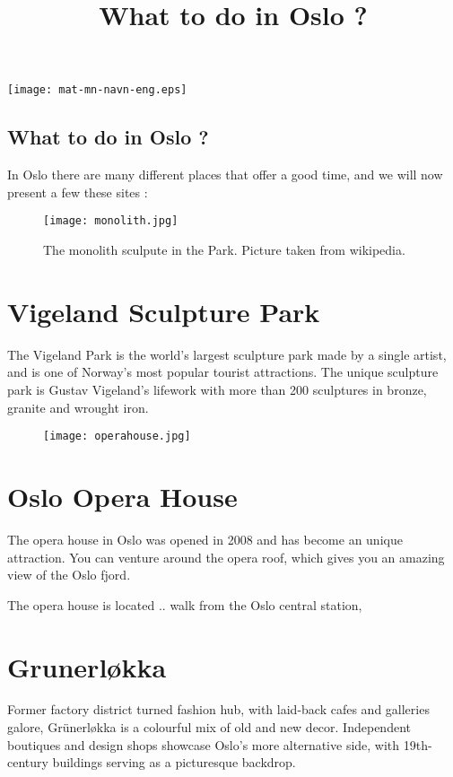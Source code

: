 \documentclass{article}
\title{What to do in Oslo ? }
\begin{document}
\texttt{[image: mat-mn-navn-eng.eps]} 


\begin{center}
\section*{What to do in Oslo ?}
In Oslo there are many different places that offer a good time, and we will now present a few these sites : 


\end{center}
\begin{wrapfigure}[20]{r}{0.5\textwidth}
    \centering
    \captionsetup{width=0.4\textwidth}
    \texttt{[image: monolith.jpg]}%
     \caption{The monolith sculpute in the Park. Picture taken from wikipedia. }
\end{wrapfigure}

\section*{Vigeland Sculpture Park} 

The Vigeland Park is the world's largest sculpture park made by a single artist, and is one of Norway's most popular tourist attractions. The unique sculpture park is Gustav Vigeland's lifework with more than 200 sculptures in bronze, granite and wrought iron. 

\vspace{2cm}
\begin{wrapfigure}[20]{l}{0.5\textwidth}
    \centering
    \texttt{[image: operahouse.jpg]}%
     \caption{ }
\end{wrapfigure}



\section*{Oslo Opera House}
The opera house in Oslo was opened in 2008 and has become an unique attraction. 
You can venture around the opera roof, which gives you an amazing view of the Oslo fjord. 

The opera house is located .. walk from the Oslo central station, 

\section*{Grunerløkka}


{\color{red}
Former factory district turned fashion hub, with laid-back cafes and galleries galore, Grünerløkka is a colourful mix of old and new decor. Independent boutiques and design shops showcase Oslo’s more alternative side, with 19th-century buildings serving as a picturesque backdrop. }
\end{document}
